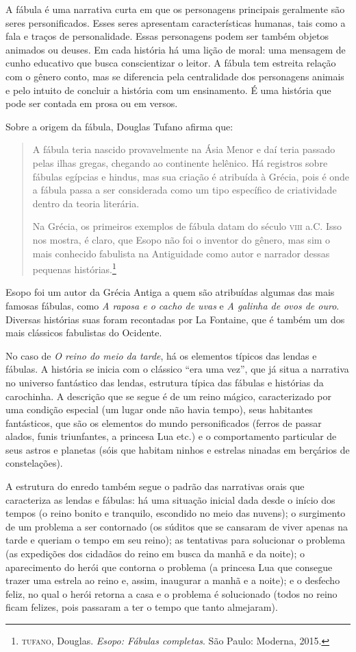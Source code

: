 \documentclass[11pt]{extarticle}
\begin{document}
A fábula é uma narrativa curta em que os personagens principais geralmente são seres personificados. Esses seres apresentam características humanas, tais como a fala e traços de personalidade. Essas personagens podem ser também objetos animados ou deuses. Em cada história há uma lição de moral: uma mensagem de cunho educativo que busca conscientizar o leitor. A fábula tem estreita relação com o gênero conto, mas se diferencia pela centralidade dos personagens animais e pelo intuito de concluir a história com um ensinamento. É uma história que pode ser contada em prosa ou em versos. 

Sobre a origem da fábula, Douglas Tufano afirma que:

\begin{quote}
A fábula teria nascido provavelmente na Ásia Menor e daí teria passado pelas ilhas gregas, chegando ao continente helênico. Há registros sobre fábulas egípcias e hindus, mas sua criação é atribuída à Grécia, pois é onde a fábula passa a ser considerada como um tipo específico de criatividade dentro da teoria literária. 

Na Grécia, os primeiros exemplos de fábula datam do século \textsc{viii} a.C. Isso nos mostra, é claro, que Esopo não foi o inventor do gênero, mas sim o mais conhecido fabulista na Antiguidade como autor e narrador dessas pequenas histórias.\footnote{\textsc{tufano}, Douglas. \textit{Esopo: Fábulas completas}. São Paulo: Moderna, 2015.}
\end{quote}

Esopo foi um autor da Grécia Antiga a quem são atribuídas algumas das mais famosas fábulas, como \textit{A raposa e o cacho de uvas} e \textit{A galinha de ovos de ouro}. Diversas  histórias suas foram recontadas por La Fontaine, que é também um dos mais clássicos fabulistas do Ocidente.

No caso de \textit{O reino do meio da tarde}, há os elementos típicos das lendas e fábulas.
A história se inicia com o clássico ``era uma vez'', que já situa a narrativa no universo fantástico das lendas, estrutura típica das fábulas e histórias da carochinha. A descrição que se segue é de um reino mágico, caracterizado por uma condição especial (um lugar onde não havia tempo), seus habitantes fantásticos, que são os elementos do mundo personificados (ferros de passar alados, funis triunfantes, a princesa Lua etc.) e o comportamento particular de seus astros e planetas (sóis que habitam ninhos e estrelas ninadas em berçários de constelações).

A estrutura do enredo também segue o padrão das narrativas orais que caracteriza as lendas e fábulas: há uma situação inicial dada desde o início dos tempos (o reino bonito e tranquilo, escondido no meio das nuvens); o surgimento de um problema a ser contornado (os súditos que se cansaram de viver apenas na tarde e queriam o tempo em seu reino); as tentativas para solucionar o problema (as expedições dos cidadãos do reino em busca da manhã e da noite); o aparecimento do herói que contorna o problema (a princesa Lua que consegue trazer uma estrela ao reino e, assim, inaugurar a manhã e a noite); e o desfecho feliz, no qual o herói retorna a casa e o problema é solucionado (todos no reino ficam felizes, pois passaram a ter o tempo que tanto almejaram).
\end{document}
